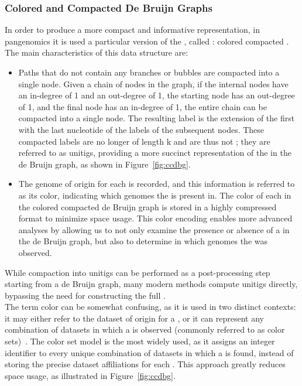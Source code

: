 \subsubsection{Colored and Compacted De Bruijn Graphs}
In order to produce a more compact and informative representation, in pangenomics it is used a particular version of the \dbg, called \ccdbg: colored compacted \dbg. The main characteristics of this data structure are:
\begin{itemize}
	\item Paths that do not contain any branches or bubbles are compacted into a single node. Given a chain of nodes in the graph, if the internal nodes have an in-degree of 1 and an out-degree of 1, the starting node has an out-degree of 1, and the final node has an in-degree of 1, the entire chain can be compacted into a single node. The resulting label is the extension of the first \kmer with the last nucleotide of the labels of the subsequent nodes. These compacted labels are no longer of length k and are thus not \kmers; they are referred to as unitigs, providing a more succinct representation of the \kmers in the de Bruijn graph, as shown in Figure~\ref{fig:ccdbg}.
	\item The genome of origin for each \kmer is recorded, and this information is referred to as its color, indicating which genomes the \kmer is present in. The color of each \kmer in the colored compacted de Bruijn graph is stored in a highly compressed format to minimize space usage. This color encoding enables more advanced analyses by allowing us to not only examine the presence or absence of a \kmer in the de Bruijn graph, but also to determine in which genomes the \kmer was observed.
\end{itemize}
While \kmer compaction into unitigs can be performed as a post-processing step starting from a de Bruijn graph, many modern methods compute unitigs directly, bypassing the need for constructing the full \dbg.\\
The term color can be somewhat confusing, as it is used in two distinct contexts: it may either refer to the dataset of origin for a \kmer, or it can represent any combination of datasets in which a \kmer is observed (commonly referred to as color sets)~\cite{marchet_kmersets}. The color set model is the most widely used, as it assigns an integer identifier to every unique combination of datasets in which a \kmer is found, instead of storing the precise dataset affiliations for each \kmer. This approach greatly reduces space usage, as illustrated in Figure~\ref{fig:ccdbg}. 
